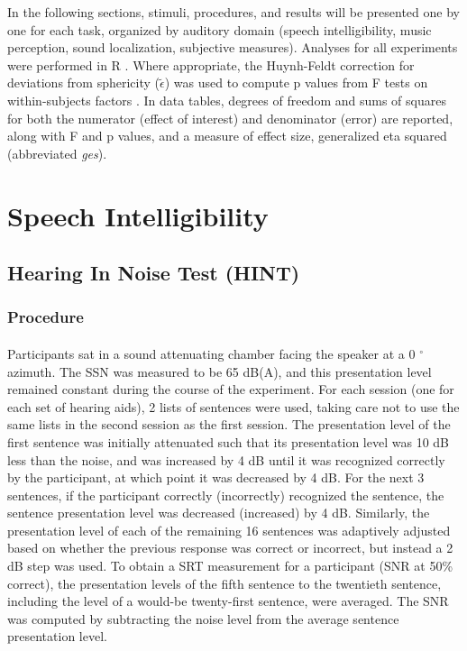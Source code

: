 In the following sections, stimuli, procedures, and results will be presented one by one for each task, organized by auditory domain (speech intelligibility, music perception, sound localization, subjective measures).  Analyses for all experiments were performed in R \cite{R2013}.  Where appropriate, the Huynh-Feldt correction for deviations from sphericity ($\tilde{\epsilon}$) was used to compute p values from F tests on within-subjects factors \cite{Maxwell2004}.  In data tables, degrees of freedom and sums of squares for both the numerator (effect of interest) and denominator (error) are reported, along with F and p values, and a measure of effect size, generalized eta squared (abbreviated \emph{ges}).

\section{Speech Intelligibility}
\subsection{Hearing In Noise Test (HINT)}
\subsubsection{Procedure}
\paragraph{}Participants sat in a sound attenuating chamber facing the speaker at a 0 $^\circ$ azimuth.  The SSN was measured to be 65 dB(A), and this presentation level remained constant during the course of the experiment.  For each session (one for each set of hearing aids), 2 lists of sentences were used, taking care not to use the same lists in the second session as the first session.  The presentation level of the first sentence was initially attenuated such that its presentation level was 10 dB less than the noise, and was increased by 4 dB until it was recognized correctly by the participant, at which point it was decreased by 4 dB.  For the next 3 sentences, if the participant correctly (incorrectly) recognized the sentence, the sentence presentation level was decreased (increased) by 4 dB.  Similarly, the presentation level of each of the remaining 16 sentences was adaptively adjusted based on whether the previous response was correct or incorrect, but instead a 2 dB step was used.  To obtain a SRT measurement for a participant (SNR at 50\% correct), the presentation levels of the fifth sentence to the twentieth sentence, including the level of a would-be twenty-first sentence, were averaged.  The SNR was computed by subtracting the noise level from the average sentence presentation level.
